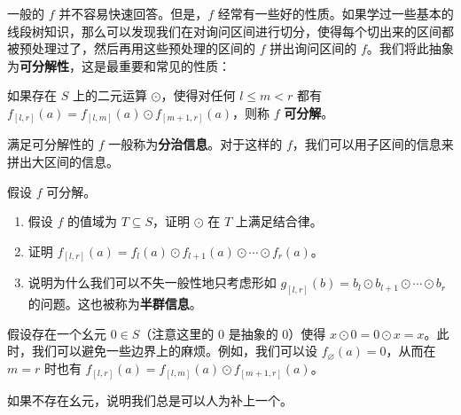 一般的 $f$ 并不容易快速回答。但是，$f$ 经常有一些好的性质。如果学过一些基本的线段树知识，那么可以发现我们在对询问区间进行切分，使得每个切出来的区间都被预处理过了，然后再用这些预处理的区间的 $f$ 拼出询问区间的 $f$。我们将此抽象为\textbf{可分解性}，这是最重要和常见的性质：
\begin{definition}[可分解性]
    如果存在 $S$ 上的二元运算 $\odot$，使得对任何 $l\le m<r$ 都有 $f_{[l,r]}(a)=f_{[l,m]}(a)\odot f_{[m+1,r]}(a)$，则称 $f$ \textbf{可分解}。
\end{definition}

满足可分解性的 $f$ 一般称为\textbf{分治信息}。对于这样的 $f$，我们可以用子区间的信息来拼出大区间的信息。

\begin{exercise}[半群信息]\label{exercise: reduce function to binary operations}
    假设 $f$ 可分解。
    \begin{enumerate}
        \item 假设 $f$ 的值域为 $T\subseteq S$，证明 $\odot$ 在 $T$ 上满足结合律。
        \item 证明 $f_{[l,r]}(a)=f_{l}(a)\odot f_{l+1}(a)\odot \cdots\odot f_r(a)$。
        \item 说明为什么我们可以不失一般性地只考虑形如 $g_{[l,r]}(b)=b_l\odot b_{l+1}\odot\cdots \odot b_r$ 的问题。这也被称为\textbf{半群信息}。
    \end{enumerate}
\end{exercise}
\begin{exercise}[幺元]
    假设存在一个幺元 $0\in S$（注意这里的 $0$ 是抽象的 $0$）使得 $x\odot 0=0\odot x=x$。此时，我们可以避免一些边界上的麻烦。例如，我们可以设 $f_{\varnothing}(a)=0$，从而在 $m=r$ 时也有 $f_{[l,r]}(a)=f_{[l,m]}(a)\odot f_{[m+1,r]}(a)$。
    
    如果不存在幺元，说明我们总是可以人为补上一个。
\end{exercise}

